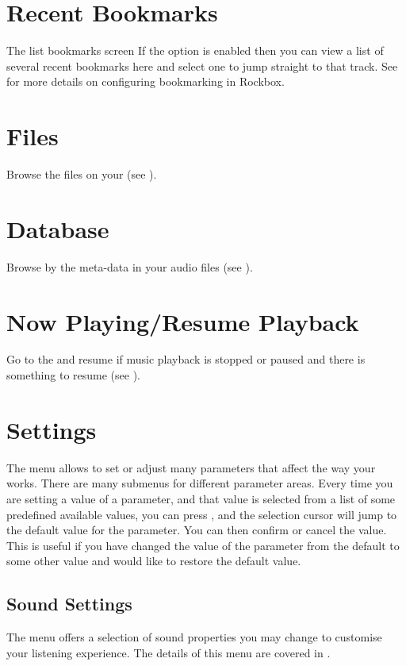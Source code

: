 \section {Recent Bookmarks}
%
  {The list bookmarks screen}{}
If the  option is enabled 
then you can view a list of several recent bookmarks here and select one to 
jump straight to that track. See  
for more details on configuring bookmarking in Rockbox.

\section{Files}
Browse the files on your \dap{} (see ).

\section{Database}
Browse by the meta-data in your audio files (see ).

\section{Now Playing/Resume Playback}
Go to the  and resume if music playback is
stopped or paused and there is something to resume (see ).

\section{Settings}

The  menu allows to set or adjust many parameters that affect
the way your \dap{} works. There are many submenus for different parameter
areas. Every time you are setting a value of a parameter, and that value is
selected from a list of some predefined available values, you can press
\ActionStdContext, and the selection cursor will jump to the default value for
the parameter. You can then confirm or cancel the value. This is useful if you
have changed the value of the parameter from the default to some other value and
would like to restore the default value.

\subsection{Sound Settings}
The  menu offers a selection of sound properties you may 
change to customise your listening experience. The details of this menu are covered
in .

